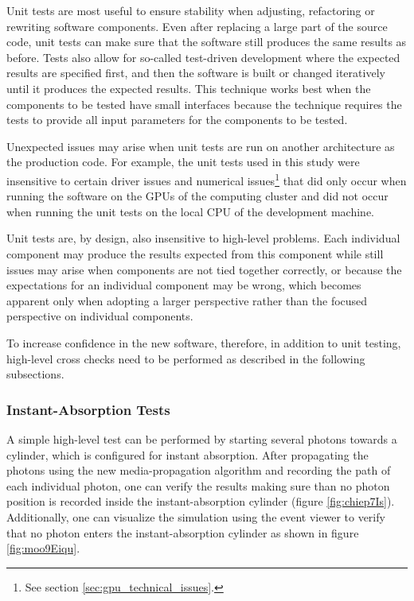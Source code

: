 Unit tests are most useful to ensure stability when adjusting,
refactoring or rewriting software components. Even after replacing a
large part of the source code, unit tests can make sure that the
software still produces the same results as before. Tests also allow for
so-called test-driven development where the expected results are
specified first, and then the software is built or changed iteratively
until it produces the expected results. This technique works best when
the components to be tested have small interfaces because the technique
requires the tests to provide all input parameters for the components to
be tested.

Unexpected issues may arise when unit tests are run on another
architecture as the production code. For example, the unit tests used in
this study were insensitive to certain driver issues and numerical
issues\footnote{See section \ref{sec:gpu_technical_issues}.} that did
only occur when running the software on the GPUs of the computing
cluster and did not occur when running the unit tests on the local CPU
of the development machine.

Unit tests are, by design, also insensitive to high-level problems. Each
individual component may produce the results expected from this
component while still issues may arise when components are not tied
together correctly, or because the expectations for an individual
component may be wrong, which becomes apparent only when adopting a
larger perspective rather than the focused perspective on individual
components.

To increase confidence in the new software, therefore, in addition to
unit testing, high-level cross checks need to be performed as described
in the following subsections.

\subsubsection{Instant-Absorption Tests}\label{instant-absorption-tests}

\label{sec:instant_absorption_tests}

A simple high-level test can be performed by starting several photons
towards a cylinder, which is configured for instant absorption. After
propagating the photons using the new media-propagation algorithm and
recording the path of each individual photon, one can verify the results
making sure than no photon position is recorded inside the
instant-absorption cylinder (figure \ref{fig:chiep7Is}). Additionally,
one can visualize the simulation using the \steamshovel event viewer to
verify that no photon enters the instant-absorption cylinder as shown in
figure \ref{fig:moo9Eiqu}.

